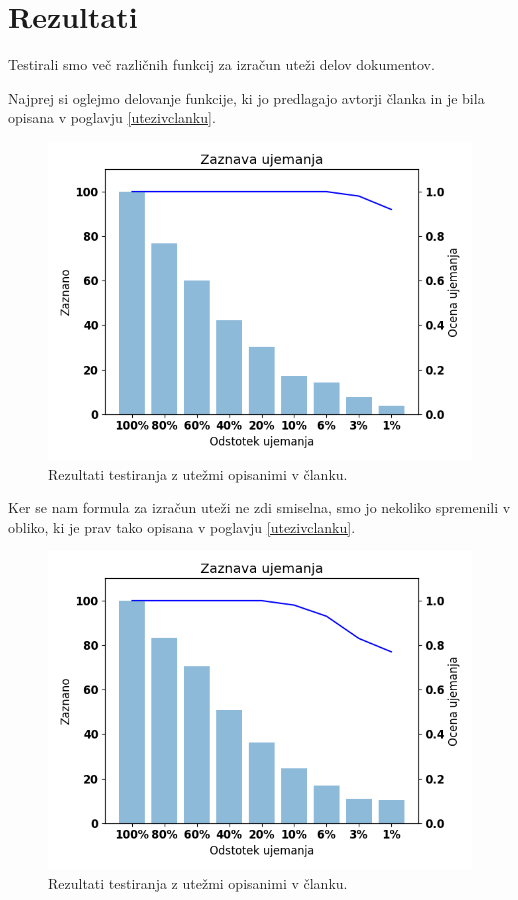 \documentclass{acm_proc_article-sp}
\begin{document}
\section{Rezultati}
Testirali smo več različnih funkcij za izračun uteži delov dokumentov.

Najprej si oglejmo delovanje funkcije, ki jo predlagajo avtorji članka \cite{fbhash} in je bila opisana v poglavju \ref{utezivclanku}.
\begin{figure}[htb]
\begin{center}
\includegraphics[width=1\columnwidth]{njihov_majhen.png}
\end{center}
\caption{\small{Rezultati testiranja z utežmi opisanimi v članku.}}
\label{fig:clanekUtezi}
\end{figure}

Ker se nam formula za izračun uteži ne zdi smiselna, smo jo nekoliko spremenili v obliko, ki je prav tako opisana v poglavju \ref{utezivclanku}.

\begin{figure}[htb]
\begin{center}
\includegraphics[width=1\columnwidth]{ch_tfidf_weight_majhna.png}
\end{center}
\caption{\small{Rezultati testiranja z utežmi opisanimi v članku.}}
\label{fig:clanekUtezi}
\end{figure}
\end{document}
